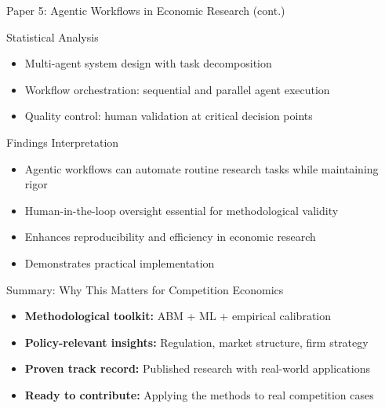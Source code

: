 \documentclass[10pt,aspectratio=169]{beamer}
\begin{document}
\begin{frame}{Paper 5: Agentic Workflows in Economic Research (cont.)}
  \begin{block}{Statistical Analysis}
    \begin{itemize}
      \item Multi-agent system design with task decomposition
      \item Workflow orchestration: sequential and parallel agent execution
      \item Quality control: human validation at critical decision points
    \end{itemize}
  \end{block}

  \begin{alertblock}{Findings Interpretation}
    \begin{itemize}
      \item Agentic workflows can automate routine research tasks while maintaining rigor
      \item Human-in-the-loop oversight essential for methodological validity
      \item Enhances reproducibility and efficiency in economic research
      \item Demonstrates practical implementation
    \end{itemize}
  \end{alertblock}
\end{frame}

\begin{frame}{Summary: Why This Matters for Competition Economics}
  \begin{itemize}
    \item \textbf{Methodological toolkit:} ABM + ML + empirical calibration
    \item \textbf{Policy-relevant insights:} Regulation, market structure, firm strategy
    \item \textbf{Proven track record:} Published research with real-world applications
    \item \textbf{Ready to contribute:} Applying the methods to real competition cases
  \end{itemize}
\end{frame}
\end{document}
